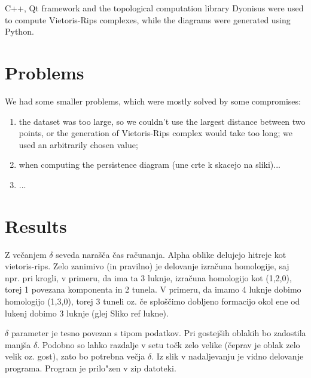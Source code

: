 \documentclass[11pt]{article}
\begin{document}
C++, Qt framework\cite{qt} and the topological computation library Dyonisus\cite{dionysus} were used to compute Vietoris-Rips complexes, while the diagrams were generated using Python\cite{python}.

\section{Problems}

We had some smaller problems, which were mostly solved by some compromises:

\begin{enumerate}
\item the dataset was too large, so we couldn't use the largest distance between two points, or the generation of Vietoris-Rips complex would take too long; we used an arbitrarily chosen value;

\item when computing the persistence diagram (une crte k skacejo na sliki)...

\item ...
\end{enumerate}

\section{Results}

Z večanjem $\delta$ seveda narašča čas računanja. Alpha oblike delujejo hitreje kot vietoris-rips. Zelo zanimivo (in pravilno) je delovanje izračuna homologije, saj npr. pri krogli, v primeru, da ima ta 3 luknje, izračuna homologijo kot (1,2,0), torej 1 povezana komponenta in 2 tunela. V primeru, da imamo 4 luknje dobimo homologijo (1,3,0), torej 3 tuneli oz. če sploščimo dobljeno formacijo okol ene od lukenj dobimo 3 luknje (glej Sliko ref lukne).


$\delta$ parameter je tesno povezan s tipom podatkov. Pri gostejših oblakih bo zadostila manjša $\delta$. Podobno so lahko razdalje v setu točk zelo velike (čeprav je oblak zelo velik oz. gost), zato bo potrebna večja $\delta$. Iz slik v nadaljevanju je vidno delovanje programa. Program je prilo"zen v zip datoteki.
\end{document}

